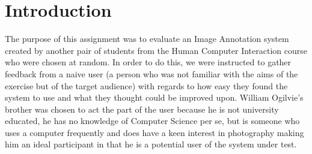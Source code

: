 \section{Introduction}

The purpose of this assignment was to evaluate an Image Annotation system created by another pair of students from the Human Computer Interaction course who were chosen at random.  In order to do this, we were instructed to gather feedback from a naive user (a person who was not familiar with the aims of the exercise but of the target audience) with regards to how easy they found the system to use and what they thought could be improved upon.  William Ogilvie's brother was chosen to act the part of the user because he is not university educated, he has no knowledge of Computer Science per se, but is someone who uses a computer frequently and does have a keen interest in photography making him an ideal participant in that he is a potential user of the system under test.
